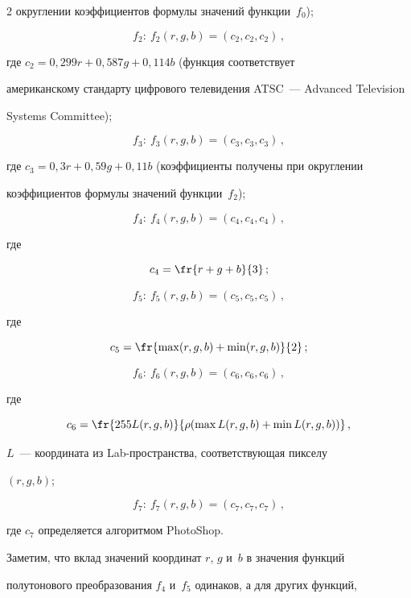 \begin{multicols}{2}
округлении коэффициентов формулы значений функции~$f_0$);

  $$

  f_2:\ f_2(r, g, b) = (c_2, c_2, c_2)\,,

  $$

  где $c_2 = 0{,}299r + 0{,}587g + 0{,}114b$ (функция соответствует

американскому стандарту цифрового телевидения ATSC~--- Advanced Television

Systems Committee);

  $$

  f_3:\ f_3(r, g, b) = (c_3, c_3, c_3)\,,

  $$

где  $c_3 = 0{,}3r + 0{,}59g + 0{,}11b$ (коэффициенты получены при округлении

коэффициентов формулы значений функции~$f_2$);

  $$

  f_4:\ f_4(r, g, b) = (c_4, c_4, c_4)\,,$$

  где

  $$c_4 = \fr{r+g+b}{3}\,;$$

  $$

  f_5:\ f_5(r, g, b) = (c_5, c_5, c_5)\,,$$

  где

  $$c_5=\fr{\max (r,g,b)+\min(r,g,b)}{2}\,;

  $$

  $$

  f_6:\ f_6(r, g, b) = (c_6, c_6, c_6)\,,

  $$

где

$$

c_6= \fr{255 L(r,g,b)}{\rho(\max L(r,g,b)+\min L(r,g,b))}\,,

  $$

  $L$~--- координата из Lab-про\-стран\-ст\-ва, соответствующая пикселу

$(r, g, b)$;

  $$

  f_7:\ f_7(r, g, b) = (c_7, c_7, c_7)\,,

  $$

где  $c_7$  определяется алгоритмом PhotoShop.



  Заметим, что вклад значений координат $r$, $g$ и~$b$ в значения функций

полутонового преобразования $f_4$ и~$f_5$ одинаков, а для других функций,


\end{multicols}
